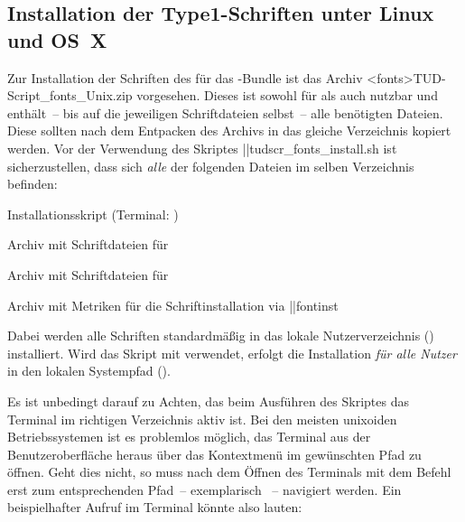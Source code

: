 \subsection{%
  Installation der Type1-Schriften unter Linux und OS~X%
  \label{sec:install:unix}%
}
%
Zur Installation der Schriften des \CDs für das \TUDScript-Bundle ist das 
Archiv \GitHubDownload*<fonts>{TUD-Script_fonts_Unix.zip} vorgesehen. Dieses 
ist sowohl für  als auch 
 nutzbar und enthält~-- bis auf die jeweiligen 
Schriftdateien selbst~-- alle benötigten Dateien. Diese sollten nach dem 
Entpacken des Archivs in das gleiche Verzeichnis kopiert werden. Vor der 
Verwendung des Skriptes \File||{tudscr_fonts_install.sh} ist sicherzustellen, 
dass sich \emph{alle} der folgenden Dateien im selben Verzeichnis befinden:
%
\settowidth{}%
\begin{description}[labelwidth=\tudscrdim,labelsep=1em]
  \item[\File||{tudscr_fonts_install.sh}]Installationsskript
    (Terminal: )
  \item[\File||{Univers_PS.zip}]Archiv mit Schriftdateien für \Univers
  \item[\File||{DIN_Bd_PS.zip}]Archiv mit Schriftdateien für \DIN
  \item[\File||{tudscr_fonts_install.zip}]Archiv mit Metriken für die
    Schriftinstallation via \Package||{fontinst}
\end{description}
%
%
Dabei werden alle Schriften standardmäßig in das lokale Nutzerverzeichnis 
() installiert. Wird das Skript mit  verwendet, 
erfolgt die Installation \emph{für alle Nutzer} in den lokalen Systempfad 
().

Es ist unbedingt darauf zu Achten, das beim Ausführen des Skriptes das Terminal 
im richtigen Verzeichnis aktiv ist. Bei den meisten unixoiden Betriebssystemen 
ist es problemlos möglich, das Terminal aus der Benutzeroberfläche heraus über 
das Kontextmenü im gewünschten Pfad zu öffnen. Geht dies nicht, so muss nach 
dem Öffnen des Terminals mit dem Befehl  erst zum entsprechenden 
Pfad~-- exemplarisch ~-- 
navigiert werden. Ein beispielhafter Aufruf im Terminal könnte also lauten:
%
\begin{quoting}
\newline
{}
\end{quoting}




